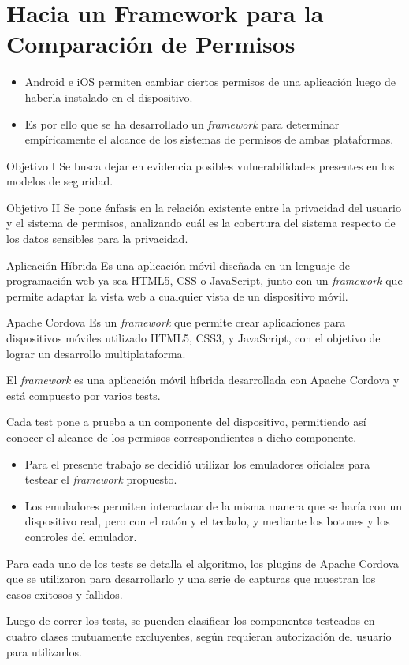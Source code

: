 \chapter{Hacia un Framework para la Comparación de Permisos}
\begin{itemize}
  \item Android e iOS permiten cambiar ciertos permisos de una aplicación luego de haberla instalado en el dispositivo.
  \item Es por ello que se ha desarrollado un \textit{framework} para determinar empíricamente el alcance de los sistemas de permisos de ambas plataformas.
\end{itemize}
\begin{paragraph}{Objetivo I}
    {Se busca dejar en evidencia posibles vulnerabilidades presentes en los modelos de seguridad.}
\end{paragraph}
\begin{paragraph}{Objetivo II}
    {Se pone énfasis en la relación existente entre la privacidad del usuario y el sistema de permisos, analizando cuál es la cobertura del sistema respecto de los datos sensibles para la privacidad.}
\end{paragraph}
\begin{paragraph}{Aplicación Híbrida}
Es una aplicación móvil diseñada en un lenguaje de programación web ya sea HTML5, CSS o JavaScript, junto con un \emph{framework} que permite adaptar la vista web a cualquier vista de un dispositivo móvil.
\end{paragraph}
\begin{paragraph}{Apache Cordova}
Es un \emph{framework} que permite crear aplicaciones para dispositivos móviles utilizado HTML5, CSS3, y JavaScript, con el objetivo de lograr un desarrollo multiplataforma.
\end{paragraph}
\begin{paragraph}{}
El \textit{framework} es {una aplicación móvil híbrida} {desarrollada con Apache Cordova} y está compuesto por varios tests.
\end{paragraph}
\begin{paragraph}{}
Cada test pone a prueba a un componente del dispositivo, permitiendo así conocer el alcance de los permisos correspondientes a dicho componente.
\end{paragraph}

\begin{itemize}
  \item Para el presente trabajo se decidió utilizar los emuladores oficiales para testear el \emph{framework} propuesto. 
  \item Los emuladores permiten interactuar de la misma manera que se haría con un dispositivo real, pero con el ratón y el teclado, y mediante los botones y los controles del emulador.
 \end{itemize}

Para cada uno de los tests se detalla el algoritmo, los plugins de Apache Cordova que se utilizaron para desarrollarlo y una serie de capturas que muestran los casos exitosos y fallidos.

Luego de correr los tests, se puenden clasificar los componentes testeados en cuatro clases mutuamente excluyentes, según requieran autorización del usuario para utilizarlos.